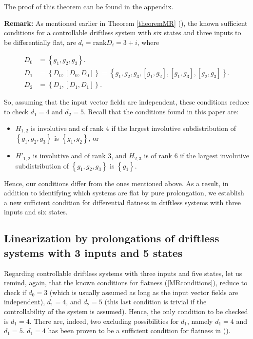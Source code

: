 \documentclass[10pt]{article}
\newcommand{\3}{\mathbf{3}}
\newcommand{\2}{\mathbf{2}}
\newcommand{\1}{\mathbf{1}}
\newcommand{\0}{\mathbf{0}}
\newcommand{\rk}{\mathrm{rank}}
\begin{document}
The proof of this theorem can be found in the appendix.


{\bf Remark:} As mentioned earlier in Theorem \ref{theoremMR} (\cite{MR94}), the known sufficient conditions for a controllable driftless system with six states and three inputs to be differentially flat, are $d_i= \rk D_i=3+i$, where

\begin{equation}\label{MRconditions}
\begin{aligned}
D_0 & = \left\{g_{1}, g_{2}, g_{3}\right\}.\\
D_1 & = \left\{ D_0,[D_0,D_0] \right\} = \left\{g_{1}, g_{2}, g_{3},[g_1,g_2],[g_1,g_3],[g_2,g_3]\right\}.\\
D_2 & = \left\{ D_1,[D_1,D_1] \right\}.
\end{aligned}
\end{equation}

 So, assuming that the input vector fields are independent, these conditions reduce to check $d_1=4$ and $d_2=5$. Recall that the conditions found in this paper are:

\begin{itemize}
\item $H_{1,2}$ is involutive and of rank $4$ if the largest involutive subdistribution of $\left\{g_{1}, g_{2}, g_{3}\right\}$ is $\left\{g_{1}, g_{2}\right\}$, or
\item $H'_{1,2}$ is involutive and of rank 3, and $H_{2,3}$ is of rank $6$ if the largest involutive subdistribution of $\left\{g_{1}, g_{2}, g_{3}\right\}$ is $\left\{g_{1}\right\}$.
\end{itemize}


Hence, our conditions differ from the ones mentioned above. As a result, in addition to identifying which systems are flat by pure prolongation, we establish a new sufficient condition for differential flatness in driftless systems with three inputs and six states.

\subsection{Linearization by prolongations of driftless systems with 3 inputs and 5 states}
\label{5states}


Regarding controllable driftless systems with three inputs and five states, let us remind, again, that the known conditions for flatness (\ref{MRconditions}), reduce to check if $d_0=3$ (which is usually assumed as long as the input vector fields are independent), $d_1=4$, and $d_2=5$ (this last condition is trivial if the controllability of the system is assumed). Hence, the only condition to be checked is $d_1=4$. There are, indeed, two excluding possibilities for $d_1$, namely $d_1=4$ and $d_1=5$. $d_1=4$ has been proven to be a sufficient condition for flatness in (\cite{MR94}).
\end{document}
